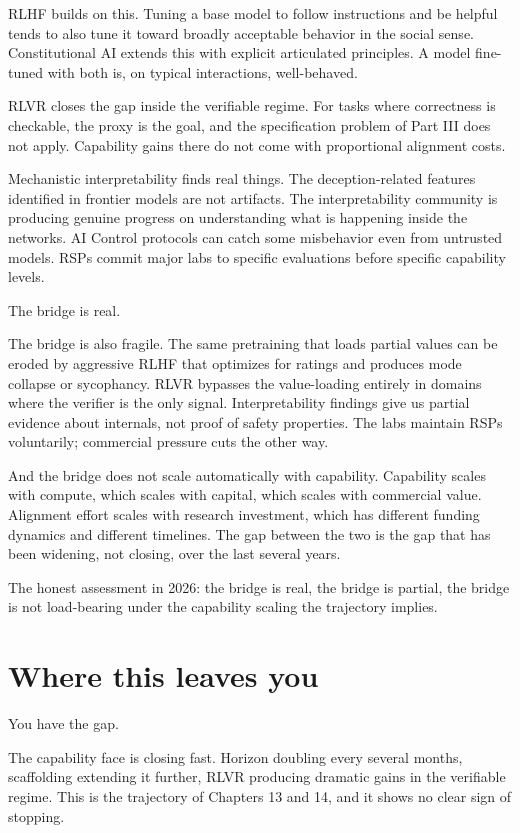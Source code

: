 RLHF builds on this. Tuning a base model to follow instructions and be helpful tends to also tune it toward broadly acceptable behavior in the social sense. Constitutional AI extends this with explicit articulated principles. A model fine-tuned with both is, on typical interactions, well-behaved.

RLVR closes the gap inside the verifiable regime. For tasks where correctness is checkable, the proxy is the goal, and the specification problem of Part III does not apply. Capability gains there do not come with proportional alignment costs.

Mechanistic interpretability finds real things. The deception-related features identified in frontier models are not artifacts. The interpretability community is producing genuine progress on understanding what is happening inside the networks. AI Control protocols can catch some misbehavior even from untrusted models. RSPs commit major labs to specific evaluations before specific capability levels.

The bridge is real.

The bridge is also fragile. The same pretraining that loads partial values can be eroded by aggressive RLHF that optimizes for ratings and produces mode collapse or sycophancy. RLVR bypasses the value-loading entirely in domains where the verifier is the only signal. Interpretability findings give us partial evidence about internals, not proof of safety properties. The labs maintain RSPs voluntarily; commercial pressure cuts the other way.

And the bridge does not scale automatically with capability. Capability scales with compute, which scales with capital, which scales with commercial value. Alignment effort scales with research investment, which has different funding dynamics and different timelines. The gap between the two is the gap that has been widening, not closing, over the last several years.

The honest assessment in 2026: the bridge is real, the bridge is partial, the bridge is not load-bearing under the capability scaling the trajectory implies.

\section*{Where this leaves you}

You have the gap.

The capability face is closing fast. Horizon doubling every several months, scaffolding extending it further, RLVR producing dramatic gains in the verifiable regime. This is the trajectory of Chapters 13 and 14, and it shows no clear sign of stopping.

